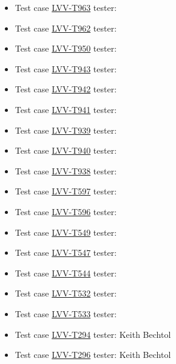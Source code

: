 \documentclass[DM,lsstdraft,STR,toc]{lsstdoc}
\begin{document}
\begin{itemize}
\begin{itemize}
\begin{itemize}
    \item Test case \href{https://jira.lsstcorp.org/secure/Tests.jspa#/testCase/LVV-T963}{LVV-T963} tester: 
    \item Test case \href{https://jira.lsstcorp.org/secure/Tests.jspa#/testCase/LVV-T962}{LVV-T962} tester: 
    \item Test case \href{https://jira.lsstcorp.org/secure/Tests.jspa#/testCase/LVV-T950}{LVV-T950} tester: 
    \item Test case \href{https://jira.lsstcorp.org/secure/Tests.jspa#/testCase/LVV-T943}{LVV-T943} tester: 
    \item Test case \href{https://jira.lsstcorp.org/secure/Tests.jspa#/testCase/LVV-T942}{LVV-T942} tester: 
    \item Test case \href{https://jira.lsstcorp.org/secure/Tests.jspa#/testCase/LVV-T941}{LVV-T941} tester: 
    \item Test case \href{https://jira.lsstcorp.org/secure/Tests.jspa#/testCase/LVV-T939}{LVV-T939} tester: 
    \item Test case \href{https://jira.lsstcorp.org/secure/Tests.jspa#/testCase/LVV-T940}{LVV-T940} tester: 
    \item Test case \href{https://jira.lsstcorp.org/secure/Tests.jspa#/testCase/LVV-T938}{LVV-T938} tester: 
    \item Test case \href{https://jira.lsstcorp.org/secure/Tests.jspa#/testCase/LVV-T597}{LVV-T597} tester: 
    \item Test case \href{https://jira.lsstcorp.org/secure/Tests.jspa#/testCase/LVV-T596}{LVV-T596} tester: 
    \item Test case \href{https://jira.lsstcorp.org/secure/Tests.jspa#/testCase/LVV-T549}{LVV-T549} tester: 
    \item Test case \href{https://jira.lsstcorp.org/secure/Tests.jspa#/testCase/LVV-T547}{LVV-T547} tester: 
    \item Test case \href{https://jira.lsstcorp.org/secure/Tests.jspa#/testCase/LVV-T544}{LVV-T544} tester: 
    \item Test case \href{https://jira.lsstcorp.org/secure/Tests.jspa#/testCase/LVV-T532}{LVV-T532} tester: 
    \item Test case \href{https://jira.lsstcorp.org/secure/Tests.jspa#/testCase/LVV-T533}{LVV-T533} tester: 
    \item Test case \href{https://jira.lsstcorp.org/secure/Tests.jspa#/testCase/LVV-T294}{LVV-T294} tester: Keith Bechtol
    \item Test case \href{https://jira.lsstcorp.org/secure/Tests.jspa#/testCase/LVV-T296}{LVV-T296} tester: Keith Bechtol

\end{itemize}
\end{itemize}
\end{itemize}
\end{document}

